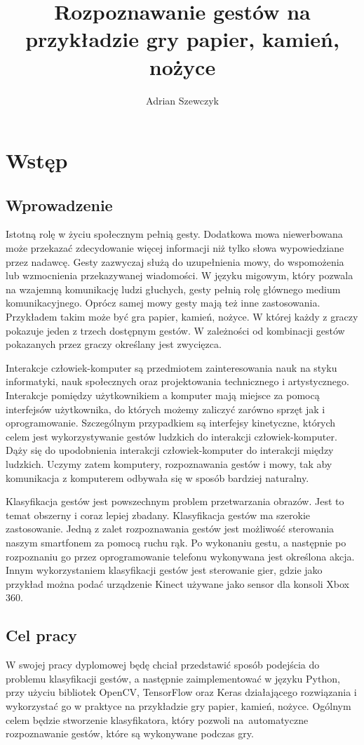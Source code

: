 \documentclass[a4paper,12pt,twoside,openany]{report}
\title{Rozpoznawanie gestów na przykładzie gry papier, kamień, nożyce}
\author{Adrian Szewczyk}
\begin{document}
\maketitle


\chapter{Wstęp}
\section{Wprowadzenie}
Istotną rolę w życiu społecznym pełnią gesty. Dodatkowa mowa niewerbowana może przekazać zdecydowanie więcej informacji niż tylko słowa wypowiedziane przez nadawcę. Gesty zazwyczaj służą do uzupełnienia mowy, do wspomożenia lub wzmocnienia przekazywanej wiadomości\cite{Collins}. W języku migowym, który pozwala na wzajemną komunikację ludzi głuchych, gesty pełnią rolę głównego medium komunikacyjnego. Oprócz samej mowy gesty mają też inne zastosowania. Przykładem takim może być gra papier, kamień, nożyce. W której każdy z graczy pokazuje jeden z trzech dostępnym gestów. W zależności od kombinacji gestów pokazanych przez graczy określany jest zwycięzca.

Interakcje człowiek-komputer są przedmiotem zainteresowania nauk na styku informatyki, nauk społecznych oraz projektowania technicznego i artystycznego. Interakcje pomiędzy użytkownikiem a komputer mają miejsce za pomocą interfejsów użytkownika, do których możemy zaliczyć zarówno sprzęt jak i oprogramowanie\cite{Kostkiewicz}. Szczególnym przypadkiem są interfejsy kinetyczne, których celem jest wykorzystywanie gestów ludzkich do interakcji człowiek-komputer. Dąży się do upodobnienia interakcji człowiek-komputer do interakcji między ludzkich. Uczymy zatem komputery, rozpoznawania gestów i mowy, tak aby komunikacja z komputerem odbywała się w sposób bardziej naturalny.

Klasyfikacja gestów jest powszechnym problem przetwarzania obrazów. Jest to temat obszerny i coraz lepiej zbadany. Klasyfikacja gestów ma szerokie zastosowanie. Jedną z zalet rozpoznawania gestów jest możliwość sterowania naszym smartfonem za pomocą ruchu rąk. Po wykonaniu gestu, a następnie po rozpoznaniu go przez  oprogramowanie telefonu wykonywana jest określona akcja. Innym wykorzystaniem klasyfikacji gestów jest sterowanie gier, gdzie jako przykład można podać urządzenie Kinect używane jako sensor dla konsoli Xbox 360\cite{Kinect}.

\section{Cel pracy}
W swojej pracy dyplomowej będę chciał przedstawić sposób podejścia do problemu klasyfikacji gestów, a następnie zaimplementować w języku Python, przy użyciu bibliotek OpenCV, TensorFlow oraz Keras działającego rozwiązania i wykorzystać go w praktyce na przykładzie gry papier, kamień, nożyce. Ogólnym celem będzie stworzenie klasyfikatora, który pozwoli na~automatyczne rozpoznawanie gestów, które są wykonywane podczas gry.
\end{document}
